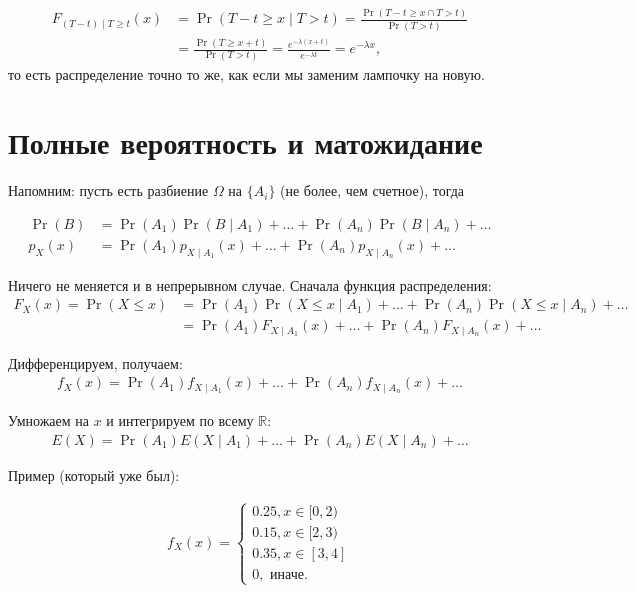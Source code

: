 \documentclass[12pt]{article}
\newcommand\R{\mathbb{R}}
\begin{document}
\begin{align*}
  F_{(T - t) \mid T \ge t}(x) &= \Pr(T - t \ge x \mid T > t) = \frac{\Pr(T - t \ge x \cap T > t)}{\Pr(T > t)} \\
  &= \frac{\Pr(T\ge x + t)}{\Pr(T > t)} = \frac{e^{-\lambda(x + t)}}{e^{-\lambda t}} = e^{-\lambda x},  
\end{align*}
то есть распределение точно то же, как если мы заменим лампочку на новую.

\section{Полные вероятность и матожидание}

Напомним: пусть есть разбиение $\Omega$ на $\{A_i\}$ (не более, чем счетное), тогда

\begin{align*}
  \Pr(B) &= \Pr(A_1) \Pr(B \mid A_1) + \dots +  \Pr(A_n) \Pr(B \mid A_n) + \dots \\
  p_X(x) &= \Pr(A_1) p_{X \mid A_1}(x) + \dots + \Pr(A_n) p_{X \mid A_n}(x) + \dots
\end{align*}

Ничего не меняется и в непрерывном случае. Сначала функция распределения:
\begin{align*}
  F_X(x) = \Pr(X \le x) &= \Pr(A_1) \Pr(X \le x \mid A_1) + \dots + \Pr(A_n) \Pr(X \le x \mid A_n) + \dots \\
  &= \Pr(A_1) F_{X \mid A_1}(x) + \dots + \Pr(A_n) F_{X \mid A_n}(x) + \dots
\end{align*}

Дифференцируем, получаем:
\begin{align*}
  f_X(x) = \Pr(A_1) f_{X \mid A_1}(x) + \dots + \Pr(A_n) f_{X \mid A_n}(x) + \dots
\end{align*}

Умножаем на $x$ и интегрируем по всему $\R$:
\begin{align*}
  E(X) = \Pr(A_1) E(X \mid A_1) + \dots + \Pr(A_n) E(X \mid A_n) + \dots
\end{align*}

Пример (который уже был): 

\begin{align*}
  f_X(x)  =\begin{cases}
    0.25, x \in [0, 2) \\
    0.15, x \in [2, 3) \\
    0.35, x \in [3, 4] \\
    0, \text{ иначе.}
  \end{cases}
\end{align*}
\end{document}
